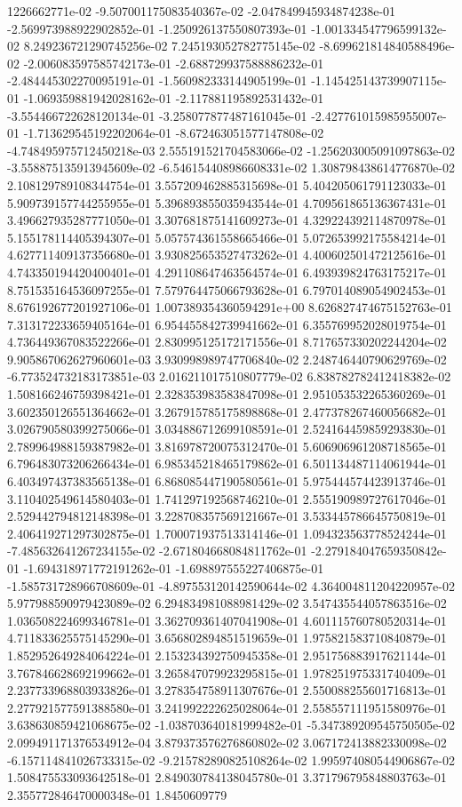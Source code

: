 1226662771e-02	-9.507001175083540367e-02	-2.047849945934874238e-01	-2.569973988922902852e-01	-1.250926137550807393e-01	-1.001334547796599132e-02	8.249236721290745256e-02	7.245193052782775145e-02	-8.699621814840588496e-02	-2.006083597585742173e-01	-2.688729937588886232e-01	-2.484445302270095191e-01	-1.560982333144905199e-01	-1.145425143739907115e-01	-1.069359881942028162e-01	-2.117881195892531432e-01	-3.554466722628120134e-01	-3.258077877487161045e-01	-2.427761015985955007e-01	-1.713629545192202064e-01	-8.672463051577147808e-02	-4.748495975712450218e-03	2.555191521704583066e-02	-1.256203005091097863e-02	-3.558875135913945609e-02	-6.546154408986608331e-02	1.308798438614776870e-02	2.108129789108344754e-01	3.557209462885315698e-01	5.404205061791123033e-01	5.909739157744255955e-01	5.396893855035943544e-01	4.709561865136367431e-01	3.496627935287771050e-01	3.307681875141609273e-01	4.329224392114870978e-01	5.155178114405394307e-01	5.057574361558665466e-01	5.072653992175584214e-01	4.627711409137356680e-01	3.930825653527473262e-01	4.400602501472125616e-01	4.743350194420400401e-01	4.291108647463564574e-01	6.493939824763175217e-01	8.751535164536097255e-01	7.579764475066793628e-01	6.797014089054902453e-01	8.676192677201927106e-01	1.007389354360594291e+00	8.626827474675152763e-01	7.313172233659405164e-01	6.954455842739941662e-01	6.355769952028019754e-01	4.736449367083522266e-01	2.830995125172171556e-01	8.717657330202244204e-02	9.905867062627960601e-03	3.930998989747706840e-02	2.248746440790629769e-02	-6.773524732183173851e-03	2.016211017510807779e-02	6.838782782412418382e-02	1.508166246759398421e-01	2.328353983583847098e-01	2.951053532265360269e-01	3.602350126551364662e-01	3.267915785175898868e-01	2.477378267460056682e-01	3.026790580399275066e-01	3.034886712699108591e-01	2.524164459859293830e-01	2.789964988159387982e-01	3.816978720075312470e-01	5.606906961208718565e-01	6.796483073206266434e-01	6.985345218465179862e-01	6.501134487114061944e-01	6.403497437383565138e-01	6.868085447190580561e-01	5.975444574423913746e-01	3.110402549614580403e-01	1.741297192568746210e-01	2.555190989727617046e-01	2.529442794812148398e-01	3.228708357569121667e-01	3.533445786645750819e-01	2.406419271297302875e-01	1.700071937513314146e-01	1.094323563778524244e-01	-7.485632641267234155e-02	-2.671804668084811762e-01	-2.279184047659350842e-01	-1.694318971772191262e-01	-1.698897555227406875e-01	-1.585731728966708609e-01	-4.897553120142590644e-02	4.364004811204220957e-02	5.977988590979423089e-02	6.294834981088981429e-02	3.547435544057863516e-02	1.036508224699346781e-01	3.362709361407041908e-01	4.601115760780520314e-01	4.711833625575145290e-01	3.656802894851519659e-01	1.975821583710840879e-01	1.852952649284064224e-01	2.153234392750945358e-01	2.951756883917621144e-01	3.767846628692199662e-01	3.265847079923295815e-01	1.978251975331740409e-01	2.237733968803933826e-01	3.278354758911307676e-01	2.550088255601716813e-01	2.277921577591388580e-01	3.241992222625028064e-01	2.558557111951580976e-01	3.638630859421068675e-02	-1.038703640181999482e-01	-5.347389209545750505e-02	2.099491171376534912e-04	3.879373576276860802e-02	3.067172413882330098e-02	-6.157114841026733315e-02	-9.215782890825108264e-02	1.995974080544906867e-02	1.508475533093642518e-01	2.849030784138045780e-01	3.371796795848803763e-01	2.355772846470000348e-01	1.8450609779